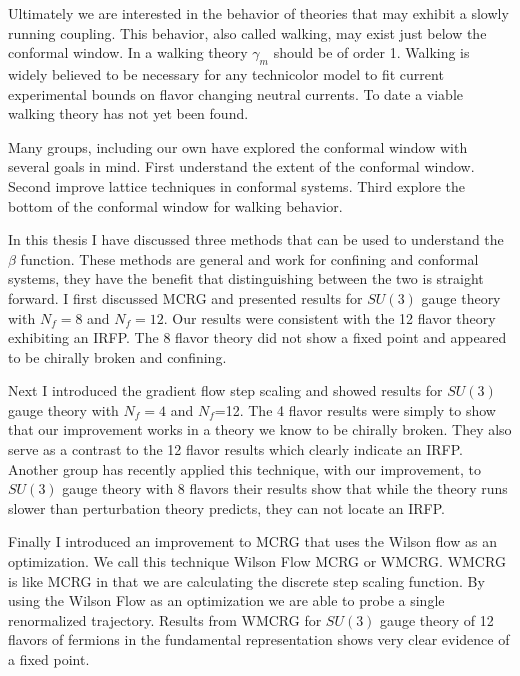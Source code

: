Ultimately we are interested in the behavior of theories that may exhibit a slowly running coupling.
This behavior, also called walking, may exist just below the conformal window.
In a walking theory $\gamma_m$ should be of order 1.
Walking is widely believed to be necessary for any technicolor model to fit current experimental bounds on flavor changing neutral currents.
To date a viable walking theory has not yet been found.

Many groups, including our own have explored the conformal window with several goals in mind.
First understand the extent of the conformal window.
Second improve lattice techniques in conformal systems.
Third explore the bottom of the conformal window for walking behavior.

In this thesis I have discussed three methods that can be used to understand the $\beta$ function.
These methods are general and work for confining and conformal systems, they have the benefit that distinguishing between the two is straight forward.
I first discussed MCRG and presented results for $SU(3)$ gauge theory with $N_f=8$ and $N_f=12$.
Our results were consistent with the 12 flavor theory exhibiting an IRFP.
The 8 flavor theory did not show a fixed point and appeared to be chirally broken and confining.

Next I introduced the gradient flow step scaling and showed results for $SU(3)$ gauge theory with $N_f=4$ and $N_f$=12.
The 4 flavor results were simply to show that our improvement works in a theory we know to be chirally broken.
They also serve as a contrast to the 12 flavor results which clearly indicate an IRFP.
Another group has recently applied this technique, with our improvement, to $SU(3)$ gauge theory with 8 flavors \cite{Hasenfratz:2014rna} their results show that while the theory runs slower than perturbation theory predicts, they can not locate an IRFP.

Finally I introduced an improvement to MCRG that uses the Wilson flow as an optimization.
We call this technique Wilson Flow MCRG or WMCRG.
WMCRG is like MCRG in that we are calculating the discrete step scaling function.
By using the Wilson Flow as an optimization we are able to probe a single renormalized trajectory.
Results from WMCRG for $SU(3)$ gauge theory of 12 flavors of fermions in the fundamental representation shows very clear evidence of a fixed point.

